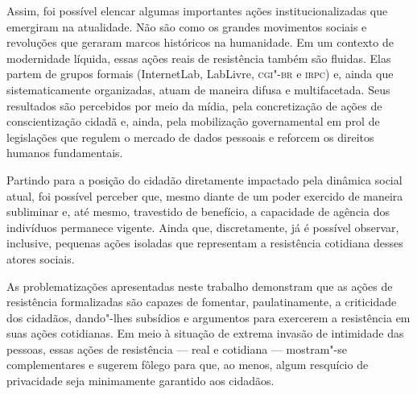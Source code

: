 Assim, foi possível elencar algumas importantes ações
institucionalizadas que emergiram na atualidade. Não são como os grandes
movimentos sociais e revoluções que geraram marcos históricos na
humanidade. Em um contexto de modernidade líquida, essas ações reais de
resistência também são fluidas. Elas partem de grupos formais
(InternetLab, LabLivre, \textsc{cgi"-br} e \textsc{irpc}) e, ainda que sistematicamente
organizadas, atuam de maneira difusa e multifacetada. Seus resultados
são percebidos por meio da mídia, pela concretização de ações de
conscientização cidadã e, ainda, pela mobilização governamental em prol
de legislações que regulem o mercado de dados pessoais e reforcem os
direitos humanos fundamentais.

Partindo para a posição do cidadão diretamente impactado pela dinâmica
social atual, foi possível perceber que, mesmo diante de um poder
exercido de maneira subliminar e, até mesmo, travestido de benefício, a
capacidade de agência dos indivíduos permanece vigente. Ainda que,
discretamente, já é possível observar, inclusive, pequenas ações
isoladas que representam a resistência cotidiana desses atores sociais.

As problematizações apresentadas neste trabalho demonstram que as ações
de resistência formalizadas são capazes de fomentar, paulatinamente, a
criticidade dos cidadãos, dando"-lhes subsídios e argumentos para
exercerem a resistência em suas ações cotidianas. Em meio à situação de
extrema invasão de intimidade das pessoas, essas ações de resistência ---
real e cotidiana --- mostram"-se complementares e sugerem fôlego para que,
ao menos, algum resquício de privacidade seja minimamente garantido aos
cidadãos.


